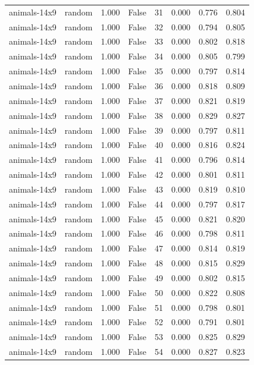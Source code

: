 \begin{tabular}{llrrrrrr}
animals-14x9 & random & 1.000 & False & 31 & 0.000 & 0.776 & 0.804 \\
animals-14x9 & random & 1.000 & False & 32 & 0.000 & 0.794 & 0.805 \\
animals-14x9 & random & 1.000 & False & 33 & 0.000 & 0.802 & 0.818 \\
animals-14x9 & random & 1.000 & False & 34 & 0.000 & 0.805 & 0.799 \\
animals-14x9 & random & 1.000 & False & 35 & 0.000 & 0.797 & 0.814 \\
animals-14x9 & random & 1.000 & False & 36 & 0.000 & 0.818 & 0.809 \\
animals-14x9 & random & 1.000 & False & 37 & 0.000 & 0.821 & 0.819 \\
animals-14x9 & random & 1.000 & False & 38 & 0.000 & 0.829 & 0.827 \\
animals-14x9 & random & 1.000 & False & 39 & 0.000 & 0.797 & 0.811 \\
animals-14x9 & random & 1.000 & False & 40 & 0.000 & 0.816 & 0.824 \\
animals-14x9 & random & 1.000 & False & 41 & 0.000 & 0.796 & 0.814 \\
animals-14x9 & random & 1.000 & False & 42 & 0.000 & 0.801 & 0.811 \\
animals-14x9 & random & 1.000 & False & 43 & 0.000 & 0.819 & 0.810 \\
animals-14x9 & random & 1.000 & False & 44 & 0.000 & 0.797 & 0.817 \\
animals-14x9 & random & 1.000 & False & 45 & 0.000 & 0.821 & 0.820 \\
animals-14x9 & random & 1.000 & False & 46 & 0.000 & 0.798 & 0.811 \\
animals-14x9 & random & 1.000 & False & 47 & 0.000 & 0.814 & 0.819 \\
animals-14x9 & random & 1.000 & False & 48 & 0.000 & 0.815 & 0.829 \\
animals-14x9 & random & 1.000 & False & 49 & 0.000 & 0.802 & 0.815 \\
animals-14x9 & random & 1.000 & False & 50 & 0.000 & 0.822 & 0.808 \\
animals-14x9 & random & 1.000 & False & 51 & 0.000 & 0.798 & 0.801 \\
animals-14x9 & random & 1.000 & False & 52 & 0.000 & 0.791 & 0.801 \\
animals-14x9 & random & 1.000 & False & 53 & 0.000 & 0.825 & 0.829 \\
animals-14x9 & random & 1.000 & False & 54 & 0.000 & 0.827 & 0.823 \\

\end{tabular}
